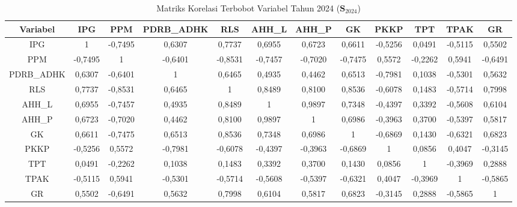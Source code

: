 \begin{table}[H]
\centering
\caption{Matriks Korelasi Terbobot Variabel Tahun 2024 ($\mathbf{S}_{2024}$)} \label{tab:app2matriks_intra_loading_2024}
\begin{adjustbox}{max width=\textwidth, max height=0.85\textheight}
\begin{tabular}{|c|c|c|c|c|c|c|c|c|c|c|c|}
\hline
\textbf{Variabel} & \textbf{IPG} & \textbf{PPM} & \textbf{PDRB\_ADHK} & \textbf{RLS} & \textbf{AHH\_L} & \textbf{AHH\_P} & \textbf{GK} & \textbf{PKKP} & \textbf{TPT} & \textbf{TPAK} & \textbf{GR} \\
\hline
IPG & 1 & -0,7495 & 0,6307 & 0,7737 & 0,6955 & 0,6723 & 0,6611 & -0,5256 & 0,0491 & -0,5115 & 0,5502 \\
PPM & -0,7495 & 1 & -0,6401 & -0,8531 & -0,7457 & -0,7020 & -0,7475 & 0,5572 & -0,2262 & 0,5941 & -0,6491 \\
PDRB\_ADHK & 0,6307 & -0,6401 & 1 & 0,6465 & 0,4935 & 0,4462 & 0,6513 & -0,7981 & 0,1038 & -0,5301 & 0,5632 \\
RLS & 0,7737 & -0,8531 & 0,6465 & 1 & 0,8489 & 0,8100 & 0,8536 & -0,6078 & 0,1483 & -0,5714 & 0,7998 \\
AHH\_L & 0,6955 & -0,7457 & 0,4935 & 0,8489 & 1 & 0,9897 & 0,7348 & -0,4397 & 0,3392 & -0,5608 & 0,6104 \\
AHH\_P & 0,6723 & -0,7020 & 0,4462 & 0,8100 & 0,9897 & 1 & 0,6986 & -0,3963 & 0,3700 & -0,5397 & 0,5817 \\
GK & 0,6611 & -0,7475 & 0,6513 & 0,8536 & 0,7348 & 0,6986 & 1 & -0,6869 & 0,1430 & -0,6321 & 0,6823 \\
PKKP & -0,5256 & 0,5572 & -0,7981 & -0,6078 & -0,4397 & -0,3963 & -0,6869 & 1 & 0,0856 & 0,4047 & -0,3145 \\
TPT & 0,0491 & -0,2262 & 0,1038 & 0,1483 & 0,3392 & 0,3700 & 0,1430 & 0,0856 & 1 & -0,3969 & 0,2888 \\
TPAK & -0,5115 & 0,5941 & -0,5301 & -0,5714 & -0,5608 & -0,5397 & -0,6321 & 0,4047 & -0,3969 & 1 & -0,5865 \\
GR & 0,5502 & -0,6491 & 0,5632 & 0,7998 & 0,6104 & 0,5817 & 0,6823 & -0,3145 & 0,2888 & -0,5865 & 1 \\
\hline
\end{tabular}
\end{adjustbox}
\end{table}